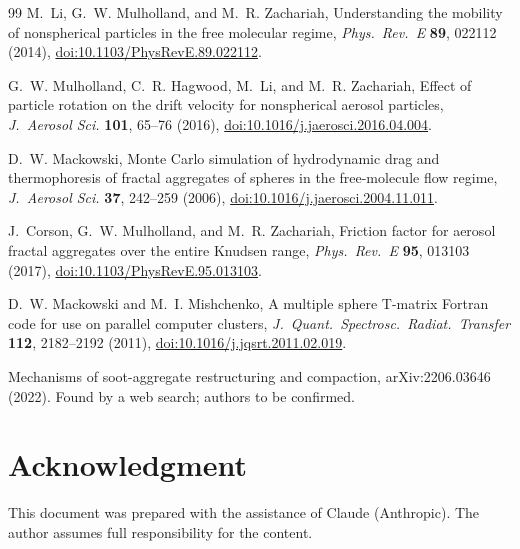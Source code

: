\documentclass[11pt,a4paper]{article}
\begin{document}
\begin{thebibliography}{99}
M.~Li, G.~W. Mulholland, and M.~R. Zachariah,
Understanding the mobility of nonspherical particles in the free molecular regime,
\emph{Phys.\ Rev.\ E} \textbf{89}, 022112 (2014),
\href{https://doi.org/10.1103/PhysRevE.89.022112}{doi:10.1103/PhysRevE.89.022112}.

G.~W. Mulholland, C.~R. Hagwood, M.~Li, and M.~R. Zachariah,
Effect of particle rotation on the drift velocity for nonspherical aerosol particles,
\emph{J.\ Aerosol Sci.} \textbf{101}, 65--76 (2016),
\href{https://doi.org/10.1016/j.jaerosci.2016.04.004}{doi:10.1016/j.jaerosci.2016.04.004}.

D.~W. Mackowski,
Monte Carlo simulation of hydrodynamic drag and thermophoresis of fractal aggregates of spheres in the free-molecule flow regime,
\emph{J.\ Aerosol Sci.} \textbf{37}, 242--259 (2006),
\href{https://doi.org/10.1016/j.jaerosci.2004.11.011}{doi:10.1016/j.jaerosci.2004.11.011}.

J.~Corson, G.~W. Mulholland, and M.~R. Zachariah,
Friction factor for aerosol fractal aggregates over the entire Knudsen range,
\emph{Phys.\ Rev.\ E} \textbf{95}, 013103 (2017),
\href{https://doi.org/10.1103/PhysRevE.95.013103}{doi:10.1103/PhysRevE.95.013103}.

D.~W. Mackowski and M.~I. Mishchenko,
A multiple sphere T-matrix Fortran code for use on parallel computer clusters,
\emph{J.\ Quant.\ Spectrosc.\ Radiat.\ Transfer} \textbf{112}, 2182--2192 (2011),
\href{https://doi.org/10.1016/j.jqsrt.2011.02.019}{doi:10.1016/j.jqsrt.2011.02.019}.

Mechanisms of soot-aggregate restructuring and compaction,
arXiv:2206.03646 (2022).
Found by a web search; authors to be confirmed.

\end{thebibliography}

\section*{Acknowledgment}
This document was prepared with the assistance of Claude (Anthropic).
The author assumes full responsibility for the content.
\end{document}
